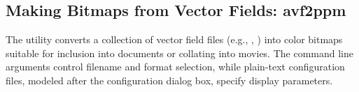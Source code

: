 
\subsection{Making Bitmaps from Vector Fields:
            avf2ppm}\label{sec:avf2ppm}%
%

The  utility converts a
collection of vector field files (e.g., , ) into color
bitmaps suitable for inclusion into documents or collating into movies.
The command line arguments control filename and format selection, while
plain-text configuration files, modeled after the
{} configuration dialog
box, specify display parameters.

